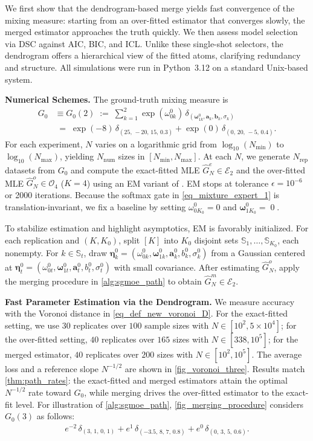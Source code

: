 \documentclass[twoside]{article}
\DeclareMathOperator*{\zero}{0} %
\theoremstyle{plain}
\theoremstyle{definition}
\theoremstyle{plain}
\def\veta{{\bm{\eta}}}
\def\vomega{{\bm{\omega}}}
\def\va{{\bm{a}}}
\def\vb{{\bm{b}}}
\newcommand{\cE}{\mathcal{E}}
\newcommand{\cO}{\mathcal{O}}
\begin{document}
We first show that the dendrogram-based merge yields fast convergence of the mixing measure: starting from an over-fitted estimator that converges slowly, the merged estimator approaches the truth quickly. We then assess model selection via DSC against AIC, BIC, and ICL. Unlike these single-shot selectors, the dendrogram offers a hierarchical view of the fitted atoms, clarifying redundancy and structure. All simulations were run in Python~3.12 on a standard Unix-based system.

{\bf Numerical Schemes.}
The ground-truth mixing measure is
{\small
\begin{align*}
    G_0 &\equiv G_0(2) \;:=\; \sum_{k=1}^{2} \exp(\omega_{0k}^{0})\,\delta_{(\vomega_{1k}^{0}, \va_{k}, \vb_{k}, \sigma_{k})}\\
    &\;=\;
    \exp(-8)\,\delta_{(25,\,-20,\,15,\,0.3)}
    +
    \exp(0)\,\delta_{(0,\,20,\,-5,\,0.4)}.
\end{align*}
}
For each experiment, $N$ varies on a logarithmic grid from $\log_{10}(N_{\min})$ to $\log_{10}(N_{\max})$, yielding $N_{\text{num}}$ sizes in $[N_{\min},N_{\max}]$. At each $N$, we generate $N_{\text{rep}}$ datasets from $G_0$ and compute the exact-fitted MLE $\widehat{G}^{e}_{N}\in\cE_{2}$ and the over-fitted MLE $\widehat{G}^{o}_{N}\in\cO_{4}$ ($K=4$) using an EM variant of \cite{Chamroukhi_2009}. EM stops at tolerance $\epsilon=10^{-6}$ or 2000 iterations. Because the softmax gate in \cref{eq_mixture_expert_1} is translation-invariant, we fix a baseline by setting
$\omega_{0K_{0}}^{0}=0$ and $\vomega_{1K_{0}}^{0}=\zero$.

To stabilize estimation and highlight asymptotics, EM is favorably initialized. For each replication and $(K,K_0)$, split $[K]$ into $K_0$ disjoint sets $\mathbb{S}_1,\ldots,\mathbb{S}_{K_0}$, each nonempty. For $k\in\mathbb{S}_t$, draw
$\veta^0_k=(\omega_{0k}^{0},\vomega_{1k}^{0},\va^0_k,b^0_k,\sigma^0_k)$
from a Gaussian centered at
$\veta^0_t=(\omega_{0t}^{0},\vomega_{1t}^{0},\va^0_t,b^0_t,\sigma^0_t)$
with small covariance. After estimating $\widehat{G}^{o}_{N}$, apply the merging procedure in \cref{alg:sgmoe_path} to obtain $\widehat{G}^{m}_{N}\in\cE_{2}$.

{\bf Fast Parameter Estimation via the Dendrogram.}
We measure accuracy with the Voronoi distance in \cref{eq_def_new_voronoi_D}. For the exact-fitted setting, we use $30$ replicates over $100$ sample sizes with $N\in[10^{2},5\!\times\!10^{4}]$; for the over-fitted setting, $40$ replicates over $165$ sizes with $N\in[338,10^{5}]$; for the merged estimator, $40$ replicates over $200$ sizes with $N\in[10^{2},10^{5}]$. The average loss and a reference slope $N^{-1/2}$ are shown in \cref{fig_voronoi_three}. Results match \cref{thm:path_rates}: the exact-fitted and merged estimators attain the optimal $N^{-1/2}$ rate toward $G_0$, while merging drives the over-fitted estimator to the exact-fit level. For illustration of \cref{alg:sgmoe_path}, \cref{fig_merging_procedure} considers $ G_0(3)$ as follows:
{\small
\begin{align}
   e^{-2}\,\delta_{(3,\,1,\,0,\,1)}
       + e^{1}\,\delta_{(-3.5,\,8,\,7,\,0.8)}
       + e^{0}\,\delta_{(0,\,3,\,5,\,0.6)}. \label{eq_G_0_3}
\end{align}
}
\end{document}
